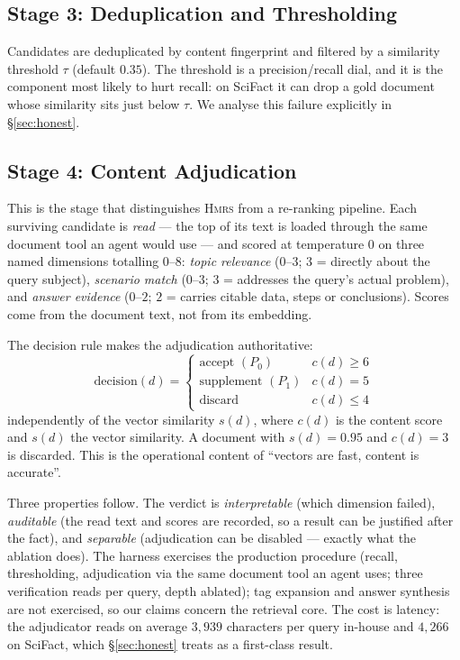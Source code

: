 \documentclass[sigconf, review, anonymous]{acmart}
\newcommand{\sys}{\textsc{Hmrs}}
\begin{document}
\subsection{Stage 3: Deduplication and Thresholding}
Candidates are deduplicated by content fingerprint and filtered by a similarity
threshold $\tau$ (default $0.35$). The threshold is a precision/recall dial, and
it is the component most likely to hurt recall: on SciFact it can drop a gold
document whose similarity sits just below $\tau$. We analyse this failure
explicitly in \S\ref{sec:honest}.

\subsection{Stage 4: Content Adjudication}\label{sec:adjudication}
This is the stage that distinguishes \sys{} from a re-ranking pipeline.
Each surviving candidate is \emph{read} --- the top of its text is loaded through
the same document tool an agent would use --- and scored at temperature $0$ on
three named dimensions totalling $0$--$8$: \emph{topic relevance} ($0$--$3$;
$3$ = directly about the query subject), \emph{scenario match} ($0$--$3$;
$3$ = addresses the query's actual problem), and \emph{answer evidence}
($0$--$2$; $2$ = carries citable data, steps or conclusions). Scores come from
the document text, not from its embedding.

The decision rule makes the adjudication authoritative:
\begin{equation}
\mathrm{decision}(d) =
\begin{cases}
\text{accept }(P_0) & c(d) \ge 6\\
\text{supplement }(P_1) & c(d) = 5\\
\text{discard} & c(d) \le 4
\end{cases}
\label{eq:override}
\end{equation}
independently of the vector similarity $s(d)$,
where $c(d)$ is the content score and $s(d)$ the vector similarity. A document
with $s(d)=0.95$ and $c(d)=3$ is discarded. This is the operational content of
``vectors are fast, content is accurate''.

Three properties follow. The verdict is \emph{interpretable} (which dimension
failed), \emph{auditable} (the read text and scores are recorded, so a result
can be justified after the fact), and \emph{separable} (adjudication can be
disabled --- exactly what the ablation does). The harness exercises the
production procedure (recall, thresholding, adjudication via the same document
tool an agent uses; three verification reads per query, depth ablated); tag
expansion and answer synthesis are not exercised, so our claims concern the
retrieval core. The cost is latency: the adjudicator reads on average
$3{,}939$ characters per query in-house and $4{,}266$ on SciFact, which
\S\ref{sec:honest} treats as a first-class result.
\end{document}

